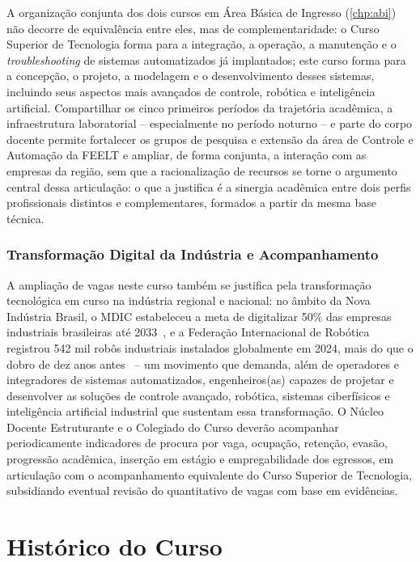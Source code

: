 A organização conjunta dos dois cursos em Área Básica de Ingresso (\autoref{chp:abi}) não decorre de equivalência entre eles, mas de complementaridade: o Curso Superior de Tecnologia forma para a integração, a operação, a manutenção e o \textit{troubleshooting} de sistemas automatizados já implantados; este curso forma para a concepção, o projeto, a modelagem e o desenvolvimento desses sistemas, incluindo seus aspectos mais avançados de controle, robótica e inteligência artificial. Compartilhar os cinco primeiros períodos da trajetória acadêmica, a infraestrutura laboratorial -- especialmente no período noturno -- e parte do corpo docente permite fortalecer os grupos de pesquisa e extensão da área de Controle e Automação da FEELT e ampliar, de forma conjunta, a interação com as empresas da região, sem que a racionalização de recursos se torne o argumento central dessa articulação: o que a justifica é a sinergia acadêmica entre dois perfis profissionais distintos e complementares, formados a partir da mesma base técnica.

\subsubsection{Transformação Digital da Indústria e Acompanhamento}

A ampliação de vagas neste curso também se justifica pela transformação tecnológica em curso na indústria regional e nacional: no âmbito da Nova Indústria Brasil, o MDIC estabeleceu a meta de digitalizar 50\% das empresas industriais brasileiras até 2033~\cite{mdic_nova_industria_brasil_2024}, e a Federação Internacional de Robótica registrou 542 mil robôs industriais instalados globalmente em 2024, mais do que o dobro de dez anos antes~\cite{abdi_boas_praticas_produtivas_2024} -- um movimento que demanda, além de operadores e integradores de sistemas automatizados, engenheiros(as) capazes de projetar e desenvolver as soluções de controle avançado, robótica, sistemas ciberfísicos e inteligência artificial industrial que sustentam essa transformação. O Núcleo Docente Estruturante e o Colegiado do Curso deverão acompanhar periodicamente indicadores de procura por vaga, ocupação, retenção, evasão, progressão acadêmica, inserção em estágio e empregabilidade dos egressos, em articulação com o acompanhamento equivalente do Curso Superior de Tecnologia, subsidiando eventual revisão do quantitativo de vagas com base em evidências.

\section{Histórico do Curso}
\label{sec:historico}

